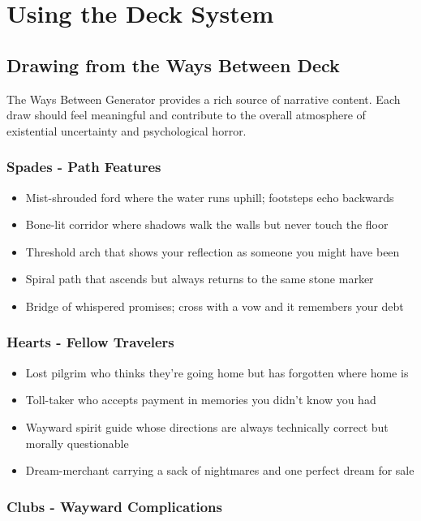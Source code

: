 \documentclass[11pt]{article}
\begin{document}
\section{Using the Deck System}

\subsection{Drawing from the Ways Between Deck}

The Ways Between Generator provides a rich source of narrative content. Each draw should feel meaningful and contribute to the overall atmosphere of existential uncertainty and psychological horror.

\subsubsection{Spades - Path Features}

\begin{itemize}
\item Mist-shrouded ford where the water runs uphill; footsteps echo backwards
\item Bone-lit corridor where shadows walk the walls but never touch the floor
\item Threshold arch that shows your reflection as someone you might have been
\item Spiral path that ascends but always returns to the same stone marker
\item Bridge of whispered promises; cross with a vow and it remembers your debt
\end{itemize}

\subsubsection{Hearts - Fellow Travelers}

\begin{itemize}
\item Lost pilgrim who thinks they're going home but has forgotten where home is
\item Toll-taker who accepts payment in memories you didn't know you had
\item Wayward spirit guide whose directions are always technically correct but morally questionable
\item Dream-merchant carrying a sack of nightmares and one perfect dream for sale
\end{itemize}

\subsubsection{Clubs - Wayward Complications}
\end{document}
